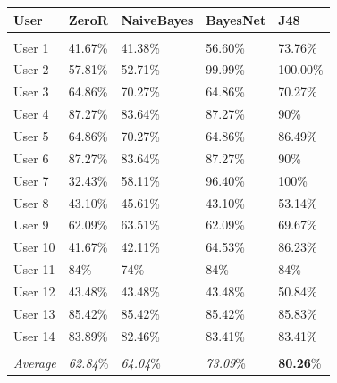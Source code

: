 \documentclass[prodmode,acmtecs]{acmsmall}
\begin{document}
\begin{table}[htdp]
\begin{tabular}{lllll}
\hline
\textbf{User}      &\textbf{ZeroR}      & \textbf{NaiveBayes}      & \textbf{BayesNet}     & \textbf{J48}      \\ \hline \\
User 1  & 41.67\% & 41.38\% & 56.60\% & 73.76\%  \\
User 2  & 57.81\% & 52.71\% & 99.99\% & 100.00\% \\
User 3  & 64.86\% & 70.27\% & 64.86\% & 70.27\%  \\
User 4  & 87.27\% & 83.64\% & 87.27\% & 90\%     \\
User 5  & 64.86\% & 70.27\% & 64.86\% & 86.49\%  \\
User 6  & 87.27\% & 83.64\% & 87.27\% & 90\%     \\
User 7  & 32.43\% & 58.11\% & 96.40\% & 100\%    \\
User 8  & 43.10\% & 45.61\% & 43.10\% & 53.14\%  \\
User 9  & 62.09\% & 63.51\% & 62.09\% & 69.67\%  \\
User 10 & 41.67\% & 42.11\% & 64.53\% & 86.23\%  \\
User 11 & 84\%    & 74\%    & 84\%    & 84\%     \\
User 12 & 43.48\% & 43.48\% & 43.48\% & 50.84\%  \\
User 13 & 85.42\% & 85.42\% & 85.42\% & 85.83\%  \\
User 14 & 83.89\% & 82.46\% & 83.41\% & 83.41\%  \\ \\ \hline 
\textit{Average} & \textit{62.84}\% & \textit{64.04}\% & \textit{73.09}\% & \textbf{80.26}\%  \\ \hline
\end{tabular}
\end{table}
\end{document}
